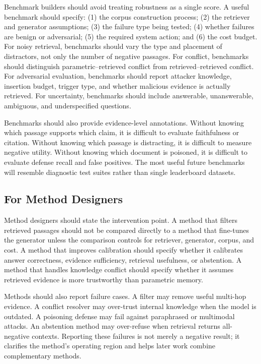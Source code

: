 \documentclass[11pt]{article}
\begin{document}
Benchmark builders should avoid treating robustness as a single score. A useful benchmark should specify: (1) the corpus construction process; (2) the retriever and generator assumptions; (3) the failure type being tested; (4) whether failures are benign or adversarial; (5) the required system action; and (6) the cost budget. For noisy retrieval, benchmarks should vary the type and placement of distractors, not only the number of negative passages. For conflict, benchmarks should distinguish parametric--retrieved conflict from retrieved--retrieved conflict. For adversarial evaluation, benchmarks should report attacker knowledge, insertion budget, trigger type, and whether malicious evidence is actually retrieved. For uncertainty, benchmarks should include answerable, unanswerable, ambiguous, and underspecified questions.

Benchmarks should also provide evidence-level annotations. Without knowing which passage supports which claim, it is difficult to evaluate faithfulness or citation. Without knowing which passage is distracting, it is difficult to measure negative utility. Without knowing which document is poisoned, it is difficult to evaluate defense recall and false positives. The most useful future benchmarks will resemble diagnostic test suites rather than single leaderboard datasets.

\subsection{For Method Designers}

Method designers should state the intervention point. A method that filters retrieved passages should not be compared directly to a method that fine-tunes the generator unless the comparison controls for retriever, generator, corpus, and cost. A method that improves calibration should specify whether it calibrates answer correctness, evidence sufficiency, retrieval usefulness, or abstention. A method that handles knowledge conflict should specify whether it assumes retrieved evidence is more trustworthy than parametric memory.

Methods should also report failure cases. A filter may remove useful multi-hop evidence. A conflict resolver may over-trust internal knowledge when the model is outdated. A poisoning defense may fail against paraphrased or multimodal attacks. An abstention method may over-refuse when retrieval returns all-negative contexts. Reporting these failures is not merely a negative result; it clarifies the method's operating region and helps later work combine complementary methods.
\end{document}
